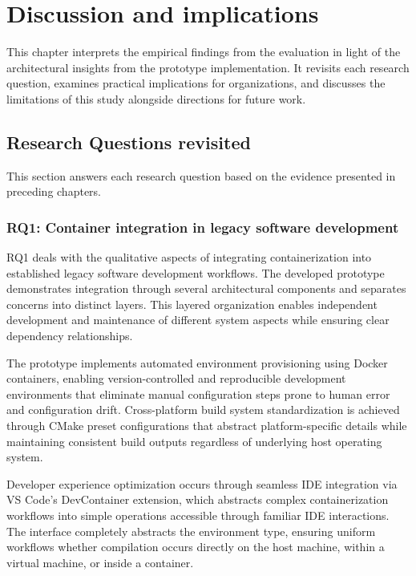 \chapter{Discussion and implications}
\label{ch:discussion}

This chapter interprets the empirical findings from the evaluation in light of the architectural insights from the prototype implementation.
It revisits each research question, examines practical implications for organizations, and discusses the limitations of this study alongside directions for future work.

\section{Research Questions revisited}

This section answers each research question based on the evidence presented in preceding chapters.

\subsection{RQ1: Container integration in legacy software development}

RQ1 deals with the qualitative aspects of integrating containerization into established legacy software development workflows.
The developed prototype demonstrates integration through several architectural components and separates concerns into distinct layers.
This layered organization enables independent development and maintenance of different system aspects while ensuring clear dependency relationships.

The prototype implements automated environment provisioning using Docker containers, enabling version-controlled and reproducible development environments that eliminate manual configuration steps prone to human error and configuration drift.
Cross-platform build system standardization is achieved through CMake preset configurations that abstract platform-specific details while maintaining consistent build outputs regardless of underlying host operating system.

Developer experience optimization occurs through seamless IDE integration via VS Code's DevContainer extension, which abstracts complex containerization workflows into simple operations accessible through familiar IDE interactions.
The interface completely abstracts the environment type, ensuring uniform workflows whether compilation occurs directly on the host machine, within a virtual machine, or inside a container.

